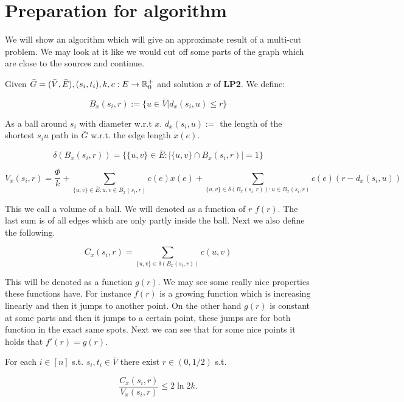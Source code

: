 \section{Preparation for algorithm}

We will show an algorithm which will give an approximate result of a multi-cut problem. We may look at it like we would cut off some parts of the graph which are close to the sources and continue.

Given $\bar{G} = (\bar{V}, \bar{E}), (s_{i}, t_{i}), k, c: E \to \mathbb{R}_{0}^{+}$ and solution $x$ of \textbf{LP2}. We define:

$$
B_{x}(s_{i}, r) := \{u \in \bar{V} | d_{x} (s_{i}, u) \leq r\}
$$

As a ball around $s_{i}$ with diameter w.r.t $x$. $d_{x} (s_{i}, u) :=$ the length of the shortest $s_{i}u$ path in $\bar{G}$ w.r.t. the edge length $x(e)$.

$$
\delta (B_{x}(s_{i}, r)) = \{\{u,v\} \in \bar{E} : |\{u,v\} \cap B_{x}(s_{i}, r)| = 1\}
$$

$$
V_{x}(s_{i}, r) = \frac{\Phi}{k} + \sum_{\{u,v\} \in \bar{E}, u,v \in B_{x}(s_{i},r)} c(e)x(e) + \sum_{\{u,v\} \in \delta(B_{x}(s_{i},r)): u \in B_{x}(s_{i},r)} c(e) (r - d_{x}(s_{i}, u))
$$

This we call a volume of a ball. We will denoted as a function of $r$ $f(r)$. The last sum is of all edges which are only partly inside the ball. Next we also define the following.

$$
C_{x}(s_{i}, r) = \sum_{\{u,v\} \in \delta(B_{x}(s_{i},r))} c(u,v)
$$

This will be denoted as a function $g(r)$. We may see some really nice properties these functions have. For instance $f(r)$ is a growing function which is increasing linearly and then it jumps to another point. On the other hand $g(r)$ is constant at some parts and then it jumps to a certain point, these jumps are for both function in the exact same spots. Next we can see that for some nice points it holds that $f'(r) = g(r)$.

\begin{lemma}
	For each $i \in [n]$ s.t. $s_{i}, t_{i} \in \bar{V}$ there exist $r \in (0, 1/2)$ s.t.
	
	$$
	\frac{C_{x}(s_{i}, r)}{V_{x}(s_{i},r)} \leq 2 \ln 2k.
	$$
\end{lemma}

